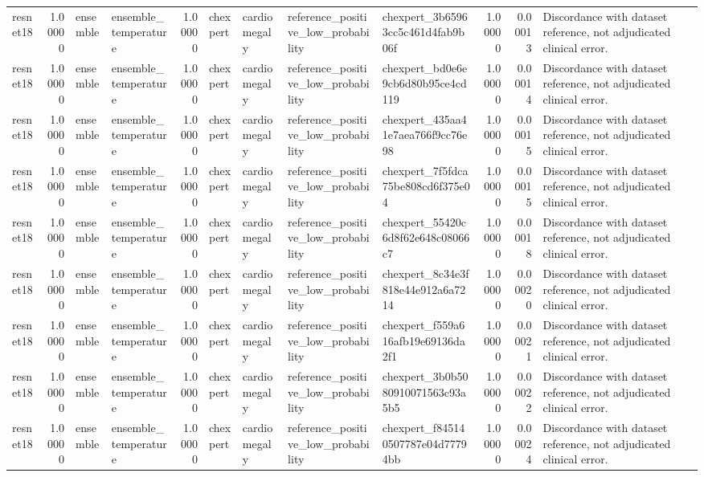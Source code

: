 \begin{tabular}{lrllrllllrrl}
resnet18 & 1.00000 & ensemble & ensemble\_temperature & 1.00000 & chexpert & cardiomegaly & reference\_positive\_low\_probability & chexpert\_3b65963cc5c461d4fab9b06f & 1.00000 & 0.00013 & Discordance with dataset reference, not adjudicated clinical error. \\
resnet18 & 1.00000 & ensemble & ensemble\_temperature & 1.00000 & chexpert & cardiomegaly & reference\_positive\_low\_probability & chexpert\_bd0e6e9cb6d80b95ce4cd119 & 1.00000 & 0.00014 & Discordance with dataset reference, not adjudicated clinical error. \\
resnet18 & 1.00000 & ensemble & ensemble\_temperature & 1.00000 & chexpert & cardiomegaly & reference\_positive\_low\_probability & chexpert\_435aa41e7aea766f9cc76e98 & 1.00000 & 0.00015 & Discordance with dataset reference, not adjudicated clinical error. \\
resnet18 & 1.00000 & ensemble & ensemble\_temperature & 1.00000 & chexpert & cardiomegaly & reference\_positive\_low\_probability & chexpert\_7f5fdca75be808cd6f375e04 & 1.00000 & 0.00015 & Discordance with dataset reference, not adjudicated clinical error. \\
resnet18 & 1.00000 & ensemble & ensemble\_temperature & 1.00000 & chexpert & cardiomegaly & reference\_positive\_low\_probability & chexpert\_55420c6d8f62e648c08066c7 & 1.00000 & 0.00018 & Discordance with dataset reference, not adjudicated clinical error. \\
resnet18 & 1.00000 & ensemble & ensemble\_temperature & 1.00000 & chexpert & cardiomegaly & reference\_positive\_low\_probability & chexpert\_8c34e3f818e44e912a6a7214 & 1.00000 & 0.00020 & Discordance with dataset reference, not adjudicated clinical error. \\
resnet18 & 1.00000 & ensemble & ensemble\_temperature & 1.00000 & chexpert & cardiomegaly & reference\_positive\_low\_probability & chexpert\_f559a616afb19e69136da2f1 & 1.00000 & 0.00021 & Discordance with dataset reference, not adjudicated clinical error. \\
resnet18 & 1.00000 & ensemble & ensemble\_temperature & 1.00000 & chexpert & cardiomegaly & reference\_positive\_low\_probability & chexpert\_3b0b5080910071563c93a5b5 & 1.00000 & 0.00022 & Discordance with dataset reference, not adjudicated clinical error. \\
resnet18 & 1.00000 & ensemble & ensemble\_temperature & 1.00000 & chexpert & cardiomegaly & reference\_positive\_low\_probability & chexpert\_f845140507787e04d77794bb & 1.00000 & 0.00024 & Discordance with dataset reference, not adjudicated clinical error. \\

\end{tabular}
